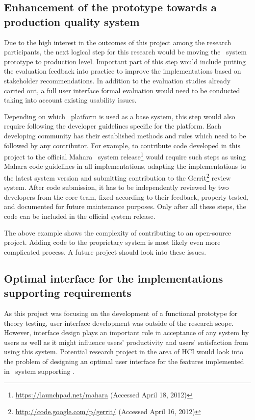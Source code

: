 \subsection[Enhancement of the prototype]{Enhancement of the prototype towards a
production quality system} 
Due to the high interest in the outcomes of this project among the research
participants, the next logical step for this research would be moving the
\ep~system prototype to production level. Important part of this step would
include putting the evaluation feedback into practice to improve the
implementations based on stakeholder recommendations. In addition to the
evaluation studies already carried out, a full user interface formal evaluation
would need to be conducted taking into account existing usability issues.

Depending on which \ep~platform is used as a base system, this step would also
require following the developer guidelines specific for the platform. Each
developing community has their established methods and rules which need to be
followed by any contributor. For example, to contribute code developed in this
project to the official Mahara \ep~system
release\footnote{\url{https://launchpad.net/mahara} (Accessed April 18, 2012)}
would require such steps as using Mahara code guidelines in all implementations,
adapting the implementations to the latest system version and submitting
contribution to the Gerrit\footnote{\url{http://code.google.com/p/gerrit/}
(Accessed April 16, 2012)} review system. After code submission, it has to be
independently reviewed by two developers from the core team, fixed according to
their feedback, properly tested, and documented for future maintenance purposes.
Only after all these steps, the code can be included in the official system
release.

The above example shows the complexity of contributing to an open-source
project. Adding code to the proprietary system is most likely even more
complicated process. A future project should look into these issues.

\subsection[Optimal interface design]{Optimal interface for the implementations
supporting \LLLs requirements} 

As this project was focusing on the development of a functional prototype for
theory testing, user interface development was outside of the research scope.
However, interface design plays an important role in acceptance of any system by
users as well as it might influence users' productivity and users' satisfaction
from using this system. Potential research project in the area of HCI would look
into the problem of designing an optimal user interface for the features
implemented in \ep~system supporting \LLLsn.

